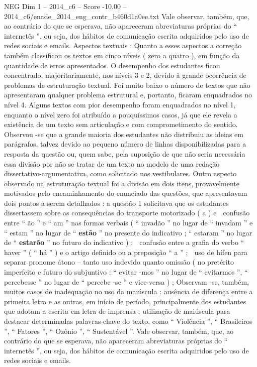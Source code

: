 \begin{textsample}{NEG Dim 1 – 2014\_c6 – Score -10.00 – 2014\_c6/enade\_2014\_eng\_contr\_b460d1a0ee.txt}
Vale observar, também, que, ao contrário do que se esperava, não apareceram abreviaturas próprias do “ internetês ”, ou seja, dos hábitos de comunicação escrita adquiridos pelo uso de redes sociais e emails.
Aspectos textuais : Quanto a esses aspectos a correção também classificou os textos em cinco níveis ( zero a quatro ), em função da quantidade de erros apresentados.
O desempenho dos estudantes ficou concentrado, majoritariamente, nos níveis 3 e 2, devido à grande ocorrência de problemas de estruturação textual.
Foi muito baixo o número de textos que não apresentaram qualquer problema estrutural e, portanto, ficaram enquadrados no nível 4.
Alguns textos com pior desempenho foram enquadrados no nível 1, enquanto o nível zero foi atribuído a pouquíssimos casos, já que ele revela a existência de um texto sem articulação e com comprometimento do sentido.
Observou -se que a grande maioria dos estudantes não distribuiu as ideias em parágrafos, talvez devido ao pequeno número de linhas disponibilizadas para a resposta da questão ou, quem sabe, pela suposição de que não seria necessária essa divisão por não se tratar de um texto no modelo de uma redação dissertativo-argumentativa, como solicitado nos vestibulares.
Outro aspecto observado na estruturação textual foi a divisão em dois itens, provavelmente motivados pelo encaminhamento do enunciado das questões, que apresentavam dois pontos a serem detalhados : a questão 1 solicitava que os estudantes dissertassem sobre as consequências do transporte motorizado ( a ) e  confusão entre “ ão ” e “ am ” nas formas verbais ( “ invadão ” no lugar de “ invadam ” e “ estam ” no lugar de “ \textbf{estão} ” no presente do indicativo ; “ estaram ” no lugar de “ \textbf{estarão} ” no futuro do indicativo ) ;  confusão entre a grafia do verbo “ haver ” ( “ há ” ) e o artigo definido ou a preposição “ a ” ;  uso de hífen para separar pronome átono – tanto uso indevido quanto omissão ( no pretérito imperfeito e futuro do subjuntivo : “ evitar -mos ” no lugar de “ evitarmos ”, “ percebesse ” no lugar de “ percebe -se ” e vice-versa ) ; Observam -se, também, muitos casos de inadequação no uso da maiúscula : ausência de diferença entre a primeira letra e as outras, em início de período, principalmente dos estudantes que adotam a escrita em letra de imprensa ; utilização de maiúscula para destacar determinadas palavras-chave do texto, como “ Violência ”, “ Brasileiros ”, “ Fatores ”, “ Ozônio ”, “ Sustentável ”.
Vale observar, também, que, ao contrário do que se esperava, não apareceram abreviaturas próprias do “ internetês ”, ou seja, dos hábitos de comunicação escrita adquiridos pelo uso de redes sociais e emails.

\end{textsample}
